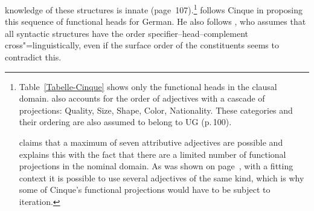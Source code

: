 knowledge of these structures is innate (page~107).\footnote{%
	Table~\ref{Tabelle-Cinque} shows only the functional heads in the clausal
        domain. \citet[, 99]{Cinque94a-u} also accounts for the order of 
	adjectives with a cascade of projections:
	Quality, Size,
  Shape, Color,
  Nationality.
  These categories and their ordering are also assumed to belong to UG (p.\,100). 

  \citet[]{Cinque94a-u} claims that a maximum of seven attributive adjectives are possible and explains this
  with the fact that there are a limited number of functional projections in the nominal domain. As was shown on page~\pageref{Beispiel-Iteration-Adjektive},
  with a fitting context it is possible to use several adjectives of the same kind, which is why some of Cinque's functional projections would have
  to be subject to iteration.
}
\citet{Laenzlinger2004a} follows Cinque in proposing this sequence of functional heads for German. He also follows \citet{Kayne94a-u}, who assumes
that all syntactic structures have the order specifier--head--complement cross"=linguistically, even if the surface order of the constituents
seems to contradict this.%

